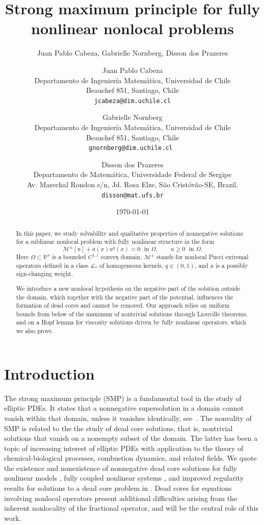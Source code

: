 \documentclass[11pt]{article}
\title{Strong maximum principle for fully nonlinear nonlocal problems}
\author{Juan Pablo Cabeza, Gabrielle Nornberg, Disson dos Prazeres }
\date{\today}
\author{
Juan Pablo Cabeza\\
\small Departamento de Ingeniería Matemática, Universidad de Chile\\
\small Beauchef 851, Santiago, Chile\\
\small\texttt{jcabeza@dim.uchile.cl}
\and
Gabrielle Nornberg\\
\small Departamento de Ingeniería Matemática, Universidad de Chile\\
\small Beauchef 851, Santiago, Chile\\
\small \texttt{gnornberg@dim.uchile.cl
}
\and
Disson dos Prazeres\\
\small Departamento de Matemática, Universidade Federal de Sergipe\\
\small Av. Marechal Rondon s/n, Jd. Rosa Elze, São Cristóvão-SE, Brazil.\\
\small\texttt{disson@mat.ufs.br}
}
\begin{document}
\maketitle


\begin{abstract}


In this paper, we study solvability and qualitative properties of nonnegative solutions for a sublinear nonlocal problem with fully nonlinear structure in the form 
$$
  \mathcal{M}^{\pm}[u]+a(x)u^{q}(x)=0 \; \text{ in }\Omega,\qquad u\geq 0 \; \text{ in }\Omega. 
$$ 
Here $\Omega \subset \mathbb{R}^n$ is a bounded $C^{1,1}$ convex domain, $\mathcal{M}^{ \pm}$ stands for nonlocal Pucci extremal operators defined in a class $\mathcal{L}_*$ of homogeneous kernels, $q\in(0,1)$, and $a$ is a possibly sign-changing weight.

We introduce a new nonlocal hypothesis on the negative part of the solution outside the domain, which together with the negative part of the potential, influences the formation of dead cores and cannot be removed. 
Our approach relies on uniform bounds from below of the maximum of nontrivial solutions through Liouville theorems, and on a Hopf lemma for viscosity solutions driven by fully nonlinear operators, which we also prove.


\end{abstract}




\section{Introduction}


The strong maximum principle (SMP) is a fundamental tool in the study of elliptic PDEs. It states that a nonnegative supersolution in a domain cannot vanish within that domain, unless it vanishes identically, see~\cite{gilbarg1977elliptic}.
The nonvality of SMP is related to the the study of dead core solutions, that is, nontrivial solutions that vanish on a nonempty subset of the domain. The latter has been a topic of increasing interest of elliptic PDEs with application to the theory of chemical-biological processes, combustion dynamics, and related fields.
We quote the existence and nonexistence of nonnegative dead core solutions for fully nonlinear models \cite{da2022non}, fully coupled nonlinear systems \cite{araujo2024fully}, and improved regularity results for solutions to a dead core problem in \cite{ SS2018,dos2025improved, T2016}.
Dead cores for equations involving nonlocal operators present additional difficulties arising from the inherent nonlocality of the fractional operator, and will be the central role of this work.
\end{document}
